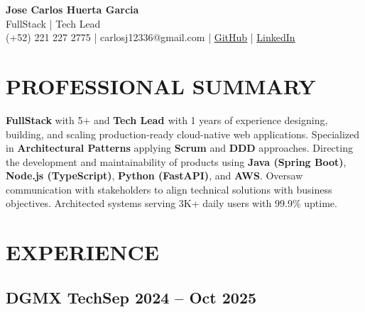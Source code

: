 \documentclass[a4paper,10pt]{article}
\newcommand{\kw}[1]{\textbf{\textcolor{keyword}{#1}}}
\begin{document}
\begin{center}
{\bfseries\LARGE Jose Carlos Huerta Garcia} \\
FullStack | Tech Lead \\
(+52) 221 227 2775 | carlosj12336@gmail.com | \href{https://github.com/jcarloshg}{GitHub} | \href{https://www.linkedin.com/in/jose-carlos-huerta-garcia-773952212}{LinkedIn}
\end{center}

\section*{PROFESSIONAL SUMMARY}
\kw{FullStack} with 5+ and \kw{Tech Lead } with 1 years of experience designing, building, and scaling production-ready cloud-native web applications. Specialized in \kw{Architectural Patterns} applying \kw{Scrum} and \kw{DDD} approaches. Directing the development and maintainability of products using \kw{Java (Spring Boot)}, \kw{Node.js (TypeScript)}, \kw{Python (FastAPI)}, and \kw{AWS}. Oversaw communication with stakeholders to align technical solutions with business objectives. Architected systems serving 3K+ daily users with 99.9\% uptime.

\section*{EXPERIENCE}

\subsection*{\small DGMX Tech\hfill\textbf{Sep 2024 -- Oct 2025}}
\end{document}
